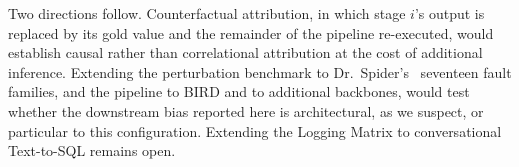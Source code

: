 \documentclass[conference]{IEEEtran}
\begin{document}
Two directions follow. Counterfactual attribution, in which stage $i$'s output
is replaced by its gold value and the remainder of the pipeline re-executed,
would establish causal rather than correlational attribution at the cost of
additional inference. Extending the perturbation benchmark to
Dr.~Spider's~\cite{chang_drspider_2023} seventeen fault families, and the
pipeline to BIRD and to additional backbones, would test whether the
downstream bias reported here is architectural, as we suspect, or particular
to this configuration. Extending the Logging Matrix to conversational
Text-to-SQL remains open.



\end{document}

